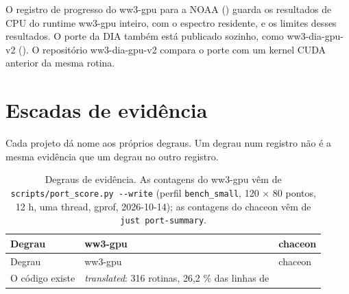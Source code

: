 \documentclass[10pt,a4paper,]{article}
\begin{document}
O registro de progresso do ww3-gpu para a NOAA
() guarda os resultados de CPU
do runtime ww3-gpu inteiro, com o espectro residente, e os limites
desses resultados. O porte da DIA também está publicado sozinho, como
ww3-dia-gpu-v2 (). O repositório
ww3-dia-gpu-v2 compara o porte com um kernel CUDA anterior da mesma
rotina.

\section{Escadas de evidência}\label{sec:ladders}

Cada projeto dá nome aos próprios degraus. Um degrau num registro não é
a mesma evidência que um degrau no outro registro.

\begin{longtable}[]{@{}
  >{\raggedright\arraybackslash}p{}
  >{\raggedright\arraybackslash}p{}
  >{\raggedright\arraybackslash}p{}@{}}
\caption{\label{tbl:ladders}Degraus de evidência. As contagens do
ww3-gpu vêm de \texttt{scripts/port\_score.py\ -\/-write} (perfil
\texttt{bench\_small}, 120 × 80 pontos, 12 h, uma thread, gprof,
2026-10-14); as contagens do chaceon vêm de
\texttt{just\ port-summary}.}\tabularnewline
\toprule\noalign{}
\begin{minipage}[b]{\linewidth}\raggedright
Degrau
\end{minipage} & \begin{minipage}[b]{\linewidth}\raggedright
ww3-gpu
\end{minipage} & \begin{minipage}[b]{\linewidth}\raggedright
chaceon
\end{minipage} \\
\midrule\noalign{}
\endfirsthead
\toprule\noalign{}
\begin{minipage}[b]{\linewidth}\raggedright
Degrau
\end{minipage} & \begin{minipage}[b]{\linewidth}\raggedright
ww3-gpu
\end{minipage} & \begin{minipage}[b]{\linewidth}\raggedright
chaceon
\end{minipage} \\
\midrule\noalign{}
\endhead
\bottomrule\noalign{}
\endlastfoot
O código existe & \emph{translated}: 316 rotinas, 26,2 \% das linhas de

\end{longtable}
\end{document}

